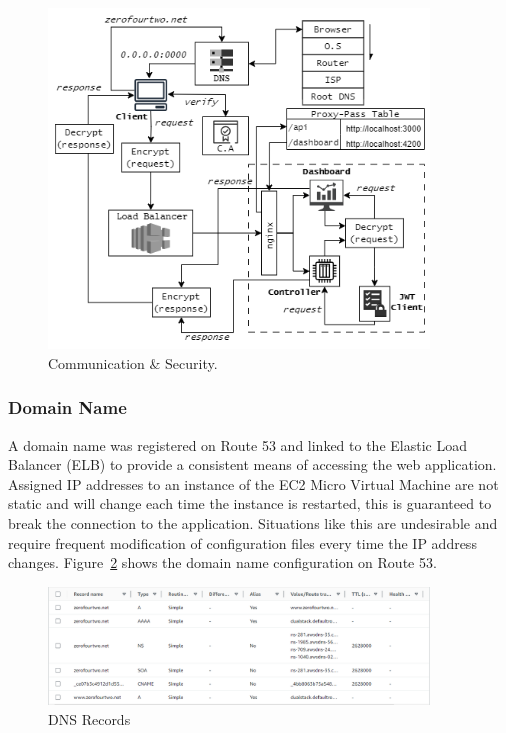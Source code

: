 \begin{figure}[h!]
    \includegraphics[width=0.9\textwidth]{images/comm_sec.png}
    \caption{Communication \& Security.}
    \label{image:comm_sec}
\end{figure}

\subsubsection*{Domain Name} A domain name was registered on Route 53 and linked to the Elastic Load Balancer (ELB) to provide a consistent means of 
accessing the web application. Assigned IP addresses to an instance of the EC2 Micro Virtual Machine are not static and will change each time the 
instance is restarted, this is guaranteed to break the connection to the application. Situations like this are undesirable and require frequent 
modification of configuration files every time the IP address changes. Figure~\ref{image:dns_record} shows the domain name configuration on Route 53.

\begin{figure}[h!]
    \begin{center}
        \includegraphics[width=0.9\textwidth]{images/dns_record.png}
        \caption{DNS Records}
        \label{image:dns_record}
    \end{center}
\end{figure}

